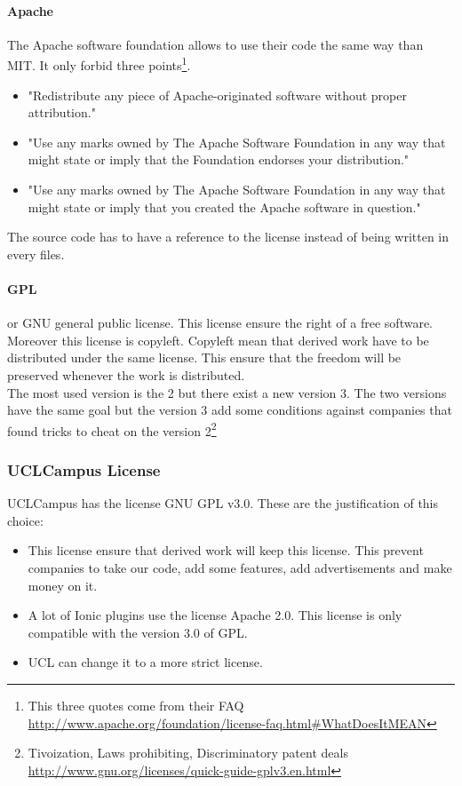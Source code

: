 \documentclass[11pt, a4paper]{report}
\begin{document}
\paragraph{Apache}
The Apache software foundation allows to use their code the same way than MIT. It only forbid three points\footnote{This three quotes come from their FAQ \url{http://www.apache.org/foundation/license-faq.html\#WhatDoesItMEAN}}.
\begin{itemize}
\item "Redistribute any piece of Apache-originated software without proper attribution."
\item "Use any marks owned by The Apache Software Foundation in any way that might state or imply that the Foundation endorses your distribution."
\item "Use any marks owned by The Apache Software Foundation in any way that might state or imply that you created the Apache software in question."
\end{itemize}
The source code has to have a reference to the license instead of being written in every files. 
\paragraph{GPL}
or GNU general public license. This license ensure the right of a free software. Moreover this license is copyleft. Copyleft mean that derived work have to be distributed under the same license. This ensure that the freedom will be preserved whenever the work is distributed.\\
The most used version is the 2 but there exist a new version 3. The two versions have the same goal but the version 3 add some conditions against companies that found tricks to cheat on the version 2\footnote{Tivoization, Laws prohibiting, Discriminatory patent deals \url{http://www.gnu.org/licenses/quick-guide-gplv3.en.html}}
\subsubsection{UCLCampus License}
UCLCampus has the license GNU GPL v3.0. These are the justification of this choice:
\begin{itemize}
\item This license ensure that derived work will keep this license. This prevent companies to take our code, add some features, add advertisements and make money on it.
\item A lot of Ionic plugins use the license Apache 2.0. This license is only compatible with the version 3.0 of GPL.
\item UCL can change it to a more strict license.
\end{itemize}
\end{document}
